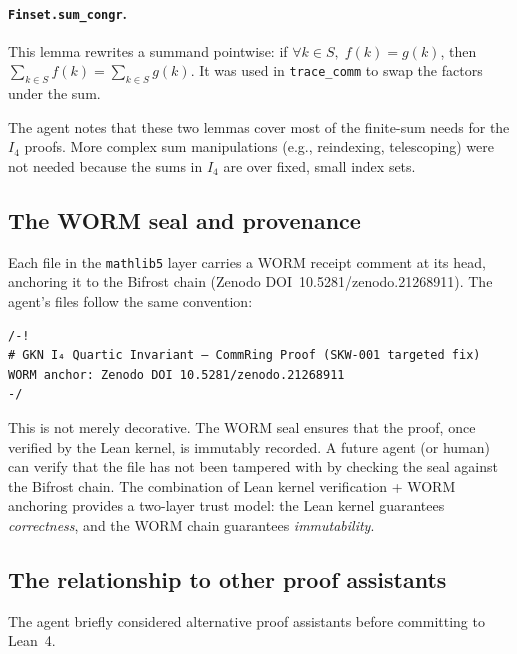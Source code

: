 \documentclass[11pt]{article}
\theoremstyle{definition}
\newcommand{\Iq}{I_4}
\begin{document}
\paragraph{\texttt{Finset.sum\_congr}.} This lemma rewrites a summand
pointwise: if $\forall k\in S,\;f(k)=g(k)$, then
$\sum_{k\in S}f(k)=\sum_{k\in S}g(k)$. It was used in \texttt{trace\_comm}
to swap the factors under the sum.

The agent notes that these two lemmas cover most of the finite-sum needs
for the $\Iq$ proofs. More complex sum manipulations (e.g., reindexing,
telescoping) were not needed because the sums in $\Iq$ are over fixed,
small index sets.

\subsection{The WORM seal and provenance}
\label{sec:agent-worm}

Each file in the \texttt{mathlib5} layer carries a WORM receipt comment
at its head, anchoring it to the Bifrost chain (Zenodo
DOI~10.5281/zenodo.21268911). The agent's files follow the same
convention:

\begin{lstlisting}
/-!
# GKN I₄ Quartic Invariant — CommRing Proof (SKW-001 targeted fix)
WORM anchor: Zenodo DOI 10.5281/zenodo.21268911
-/
\end{lstlisting}

This is not merely decorative. The WORM seal ensures that the proof, once
verified by the Lean kernel, is immutably recorded. A future agent (or
human) can verify that the file has not been tampered with by checking the
seal against the Bifrost chain. The combination of Lean kernel
verification + WORM anchoring provides a two-layer trust model: the Lean
kernel guarantees \emph{correctness}, and the WORM chain guarantees
\emph{immutability}.

\subsection{The relationship to other proof assistants}
\label{sec:agent-other}

The agent briefly considered alternative proof assistants before
committing to Lean~4.
\end{document}
